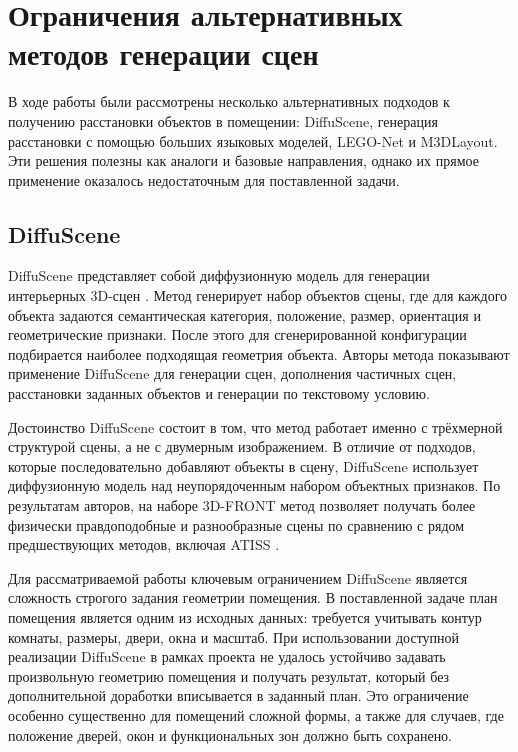 \documentclass[times]{itmo-student-thesis}
\begin{document}
\section{Ограничения альтернативных методов генерации сцен}

В ходе работы были рассмотрены несколько альтернативных подходов к получению расстановки объектов в помещении: DiffuScene, генерация расстановки с помощью больших языковых моделей, LEGO-Net и M3DLayout. Эти решения полезны как аналоги и базовые направления, однако их прямое применение оказалось недостаточным для поставленной задачи.

\subsection{DiffuScene}

DiffuScene представляет собой диффузионную модель для генерации интерьерных 3D-сцен \cite{tang2024diffuscene}. Метод генерирует набор объектов сцены, где для каждого объекта задаются семантическая категория, положение, размер, ориентация и геометрические признаки. После этого для сгенерированной конфигурации подбирается наиболее подходящая геометрия объекта. Авторы метода показывают применение DiffuScene для генерации сцен, дополнения частичных сцен, расстановки заданных объектов и генерации по текстовому условию.

Достоинство DiffuScene состоит в том, что метод работает именно с трёхмерной структурой сцены, а не с двумерным изображением. В отличие от подходов, которые последовательно добавляют объекты в сцену, DiffuScene использует диффузионную модель над неупорядоченным набором объектных признаков. По результатам авторов, на наборе 3D-FRONT метод позволяет получать более физически правдоподобные и разнообразные сцены по сравнению с рядом предшествующих методов, включая ATISS \cite{tang2024diffuscene,paschalidou2021atiss}.

Для рассматриваемой работы ключевым ограничением DiffuScene является сложность строгого задания геометрии помещения. В поставленной задаче план помещения является одним из исходных данных: требуется учитывать контур комнаты, размеры, двери, окна и масштаб. При использовании доступной реализации DiffuScene в рамках проекта не удалось устойчиво задавать произвольную геометрию помещения и получать результат, который без дополнительной доработки вписывается в заданный план. Это ограничение особенно существенно для помещений сложной формы, а также для случаев, где положение дверей, окон и функциональных зон должно быть сохранено.
\end{document}
